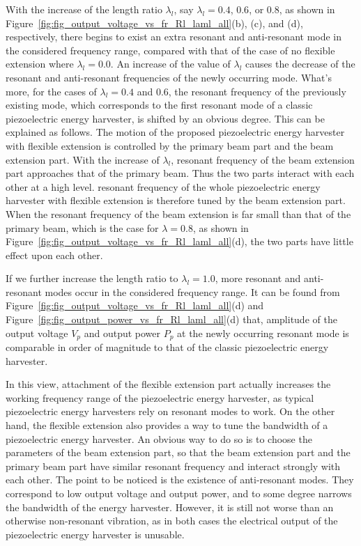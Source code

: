 \documentclass{elsarticle}
\begin{document}
With the increase of the length ratio $\lambda_l$, say $\lambda_l = 0.4$, $0.6$, or $0.8$, as shown in Figure~\ref{fig:fig_output_voltage_vs_fr_Rl_laml_all}(b), (c), and (d), respectively, there begins to exist an extra resonant and anti-resonant mode in the considered frequency range, compared with that of the case of no flexible extension where $\lambda_l = 0.0$. An increase of the value of $\lambda_l$ causes the decrease of the resonant and anti-resonant frequencies of the newly occurring mode. What's more, for the cases of $\lambda_l = 0.4$ and $0.6$, the resonant frequency of the previously existing mode, which corresponds to the first resonant mode of a classic piezoelectric energy harvester, is shifted by an obvious degree. This can be explained as follows. The motion of the proposed piezoelectric energy harvester with flexible extension is controlled by the primary beam part and the beam extension part. With the increase of $\lambda_l$, resonant frequency of the beam extension part approaches that of the primary beam. Thus the two parts interact with each other at a high level. resonant frequency of the whole piezoelectric energy harvester with flexible extension is therefore tuned by the beam extension part. When the resonant frequency of the beam extension is far small than that of the primary beam, which is the case for $\lambda = 0.8$, as shown in Figure~\ref{fig:fig_output_voltage_vs_fr_Rl_laml_all}(d), the two parts have little effect upon each other. 

If we further increase the length ratio to $\lambda_l = 1.0$, more resonant and anti-resonant modes occur in the considered frequency range. It can be found from Figure~\ref{fig:fig_output_voltage_vs_fr_Rl_laml_all}(d) and Figure~\ref{fig:fig_output_power_vs_fr_Rl_laml_all}(d) that, amplitude of the output voltage $V_p$ and output power $P_p$ at the newly occurring resonant mode is comparable in order of magnitude to that of the classic piezoelectric energy harvester. 


In this view, attachment of the flexible extension part actually increases the working frequency range of the piezoelectric energy harvester, as typical piezoelectric energy harvesters rely on resonant modes to work. On the other hand, the flexible extension also provides a way to tune the bandwidth of a piezoelectric energy harvester. An obvious way to do so is to choose the parameters of the beam extension part, so that the beam extension part and the primary beam part have similar resonant frequency and interact strongly with each other. The point to be noticed is the existence of anti-resonant modes. They correspond to low output voltage and output power, and to some degree narrows the bandwidth of the energy harvester. However, it is still not worse than an otherwise non-resonant vibration, as in both cases the electrical output of the piezoelectric energy harvester is unusable.
\end{document}
